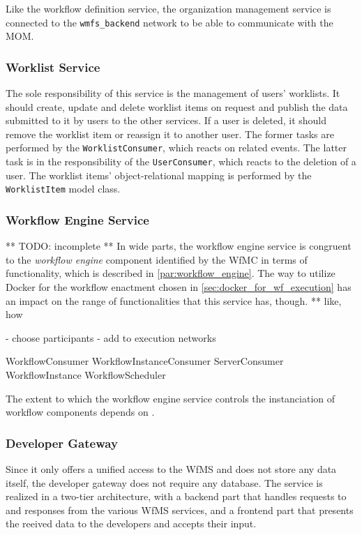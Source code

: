     Like the workflow definition service, the organization management service is connected to the \texttt{wmfs\_backend} network to be able to communicate with the \ac{MOM}.

  \subsubsection{Worklist Service} %
    \label{subs:worklist_service}
    The sole responsibility of this service is the management of users' worklists. It should create, update and delete worklist items on request and publish the data submitted to it by users to the other services. If a user is deleted, it should remove the worklist item or reassign it to another user. The former tasks are performed by the \texttt{WorklistConsumer}, which reacts on related events. The latter task is in the responsibility of the \texttt{UserConsumer}, which reacts to the deletion of a user. The worklist items' object-relational mapping is performed by the \texttt{WorklistItem} model class.

  \subsubsection{Workflow Engine Service} %
    \label{subs:workflow_engine_service}
    ** TODO: incomplete **
    In wide parts, the workflow engine service is congruent to the \emph{workflow engine} component identified by the \ac{WfMC} in terms of functionality, which is described in \ref{par:workflow_engine}. The way to utilize Docker for the workflow enactment chosen in \ref{sec:docker_for_wf_execution} has an impact on the range of functionalities that this service has, though. ** like, how

    - choose participants
    - add to execution networks

    WorkflowConsumer
    WorkflowInstanceConsumer
    ServerConsumer
    WorkflowInstance
    WorkflowScheduler


    The extent to which the workflow engine service controls the instanciation of workflow components depends on .

  \subsubsection{Developer Gateway} %
    \label{subs:developer_gateway}
    Since it only offers a unified access to the \ac{WfMS} and does not store any data itself, the developer gateway does not require any database. The service is realized in a two-tier architecture, with a backend part that handles requests to and responses from the various \ac{WfMS} services, and a frontend part that presents the reeived data to the developers and accepts their input.

